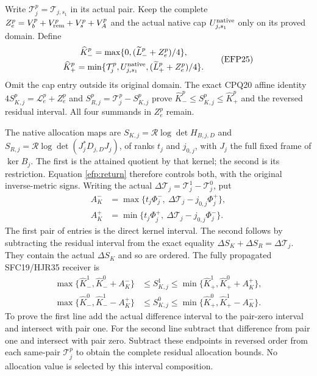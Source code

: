 \documentclass[11pt,a4paper]{article}
\begin{document}
Write $\mathcal T_j^p=\mathcal T_{j,s_1}$ in its actual pair.
Keep the complete $Z_e^p=V_b^p+V_{\rm rem}^p+V_s^p+V_A^p$ and
the actual native cap $U_{j,s_1}^{\rm native}$ only on its proved
domain. Define
\[
\begin{gathered}
\widehat K_-^p=\max\{0,(\widetilde L_-^p+Z_e^p)/4\},\\
\widehat K_+^p=\min\{\mathcal T_j^p,U_{j,s_1}^{\rm native},
                      (\widetilde L_+^p+Z_e^p)/4\}.
\end{gathered}\tag{EFP25}\label{efp:K}
\]
Omit the cap entry outside its original domain.
The exact CPQ20 affine identity $4S_{K,j}^p=\mathcal L_e^p+Z_e^p$
and $S_{R,j}^p=\mathcal T_j^p-S_{K,j}^p$ prove
$\widehat K_-^p\le S_{K,j}^p\le\widehat K_+^p$ and the reversed
residual interval. All four summands in $Z_e^p$ remain.

The native allocation maps are
$S_{K,j}=\mathcal R\log\det H_{B,j,D}$
and $S_{R,j}=\mathcal R\log\det(J_j^*D_{j,D}J_j)$,
of ranks $t_j$ and $j_{0,j}$, with $J_j$ the full fixed frame
of $\ker B_j$. The first is the attained quotient by that kernel;
the second is its restriction. Equation \eqref{efp:return} therefore
controls both, with the original inverse-metric signs.
Writing the actual $\Delta\mathcal T_j=\mathcal T_j^1-\mathcal T_j^0$,
put
\[
\begin{aligned}
A_K^-&=\max\{t_j\Phi_j^-,\ \Delta\mathcal T_j-j_{0,j}\Phi_j^+\},\\
A_K^+&=\min\{t_j\Phi_j^+,\ \Delta\mathcal T_j-j_{0,j}\Phi_j^-\}.
\end{aligned}\tag{EFP26}\label{efp:allocationdifference}
\]
The first pair of entries is the direct kernel interval.
The second follows by subtracting the residual interval from the
exact equality $\Delta S_K+\Delta S_R=\Delta\mathcal T_j$.
They contain the actual $\Delta S_K$ and so are ordered.
The fully propagated SFC19/HJR35 receiver is
\[
\begin{aligned}
\max\{\widehat K_-^1,\widehat K_-^0+A_K^-\}
 &\le S_{K,j}^{1}
 \le\min\{\widehat K_+^1,\widehat K_+^0+A_K^+\},\\
\max\{\widehat K_-^0,\widehat K_-^1-A_K^+\}
 &\le S_{K,j}^{0}
 \le\min\{\widehat K_+^0,\widehat K_+^1-A_K^-\}.
\end{aligned}\tag{EFP27}\label{efp:allocation}
\]
To prove the first line add the actual difference interval to the
pair-zero interval and intersect with pair one. For the second line
subtract that difference from pair one and intersect with pair zero.
Subtract these endpoints in reversed order from each same-pair
$\mathcal T_j^p$ to obtain the complete residual allocation bounds.
No allocation value is selected by this interval composition.
\end{document}
